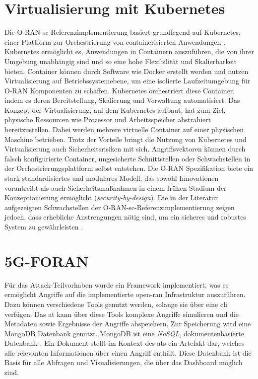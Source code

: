 \section{Virtualisierung mit Kubernetes}
Die O-RAN \gls{sc} Referenzimplementierung basiert grundlegend auf Kubernetes, einer Plattform zur Orchestrierung von containerisierten Anwendungen \autocite{ReleaseReleasesConfluence}. Kubernetes ermöglicht es, Anwendungen in Containern auszuführen, die von ihrer Umgebung unabhängig sind und so eine hohe Flexibilität und Skalierbarkeit bieten. Container können durch Software wie Docker erstellt werden und nutzen Virtualisierung auf Betriebssystemebene, um eine isolierte Laufzeitumgebung für O-RAN Komponenten zu schaffen. Kubernetes orchestriert diese Container, indem es deren Bereitstellung, Skalierung und Verwaltung automatisiert. Das Konzept der Virtualisierung, auf dem Kubernetes aufbaut, hat zum Ziel, physische Ressourcen wie Prozessor und Arbeitsspeicher abstrahiert bereitzustellen. Dabei werden mehrere virtuelle Container auf einer physischen Maschine betrieben. Trotz der Vorteile bringt die Nutzung von Kubernetes und Virtualisierung auch Sicherheitsrisiken mit sich. Angriffsvektoren können durch falsch konfigurierte Container, ungesicherte Schnittstellen oder Schwachstellen in der Orchestrierungsplattform selbst entstehen.
Die O-RAN Spezifikation biete ein stark standardisiertes und modulares Modell, das sowohl Innovationen vorantreibt als auch Sicherheitsmaßnahmen in einem frühen Stadium der Konzeptionierung ermöglicht (\textit{security-by-design}). Die in der Literatur aufgezeigten Schwachstellen der O-RAN-\gls{sc}-Referenzimplementierung zeigen jedoch, dass erhebliche Anstrengungen nötig sind, um ein sicheres und robustes System zu gewährleisten \autocite{klementSecuringOpenRAN2024}.

\section{5G-FORAN}
\label{sec:tech-foran}
Für das Attack-Teilvorhaben wurde ein Framework implementiert, was es ermöglicht Angriffe auf die implementierte \gls{open-ran} Infrastruktur auszuführen. Dazu können verschiedene Tools genutzt werden, solange sie über eine \gls{cli} verfügen. Das \gls{at} kann über diese Tools komplexe Angriffe simulieren und die Metadaten sowie Ergebnisse der Angriffe abspeichern. Zur Speicherung wird eine MongoDB Datenbank genutzt. MongoDB ist eine \textit{NoSQL}, dokumentenbasierte Datenbank \autocite{MongoDBDeveloperData}. Ein Dokument stellt im Kontext des \glspl{at} ein Artefakt dar, welches alle relevanten Informationen über einen Angriff enthält. Diese Datenbank ist die Basis für alle Abfragen und Visualisierungen, die über das Dashboard möglich sind.

